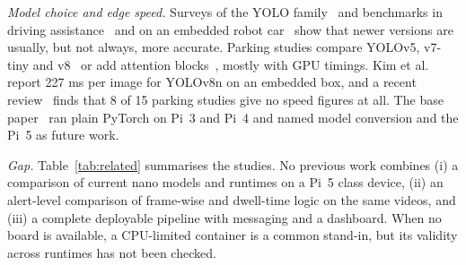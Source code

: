 \documentclass[conference]{IEEEtran}
\begin{document}
\textit{Model choice and edge speed.} Surveys of the YOLO family~\cite{sapkota2025} and benchmarks in driving assistance~\cite{chaman2026} and on an embedded robot car~\cite{reveles2025} show that newer versions are usually, but not always, more accurate. Parking studies compare YOLOv5, v7-tiny and v8~\cite{garta2025} or add attention blocks~\cite{zhao2024}, mostly with GPU timings. Kim et al.~\cite{kim2025} report 227 ms per image for YOLOv8n on an embedded box, and a recent review~\cite{yunganina2026} finds that 8 of 15 parking studies give no speed figures at all. The base paper~\cite{daluz2026} ran plain PyTorch on Pi~3 and Pi~4 and named model conversion and the Pi~5 as future work.

\textit{Gap.} Table~\ref{tab:related} summarises the studies. No previous work combines (i) a comparison of current nano models and runtimes on a Pi~5 class device, (ii) an alert-level comparison of frame-wise and dwell-time logic on the same videos, and (iii) a complete deployable pipeline with messaging and a dashboard. When no board is available, a CPU-limited container is a common stand-in, but its validity across runtimes has not been checked.
\end{document}
